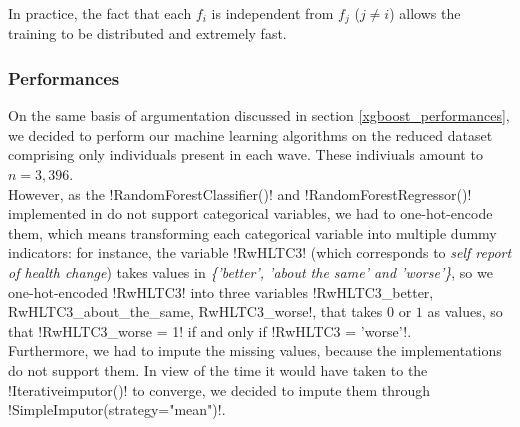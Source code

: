 \documentclass[]{article}
\begin{document}
\noindent
In practice, the fact that each $f_i$ is independent from $f_j$ ($j\ne i$) allows the training to be distributed and extremely fast.
\subsubsection{Performances}
\label{randomForest_performances}
On the same basis of argumentation discussed in section \ref{xgboost_performances}, we decided to perform our machine learning algorithms on the reduced dataset comprising only individuals present in each wave. These indiviuals amount to $n = 3,396$.\\

\noindent
However, as the \pyth!RandomForestClassifier()! and \pyth!RandomForestRegressor()! implemented in \sklearn do not support categorical variables, we had to one-hot-encode them, which means transforming each categorical variable into multiple dummy indicators: for instance, the variable \pyth!RwHLTC3! (which corresponds to \textit{self report of health change}) takes values in \textit{\{'better', 'about the same' and 'worse'\}}, so we one-hot-encoded \pyth!RwHLTC3! into three variables \pyth!RwHLTC3_better, RwHLTC3_about_the_same, RwHLTC3_worse!, that takes $0$ or $1$ as values, so that \pyth!RwHLTC3_worse =  1! if and only if \pyth!RwHLTC3 = 'worse'!.\\
Furthermore, we had to impute the missing values, because the \sklearn implementations do not support them. In view of the time it would have taken to the \pyth!Iterativeimputor()! to converge, we decided to impute them through \pyth!SimpleImputor(strategy="mean")!.\\
\end{document}
